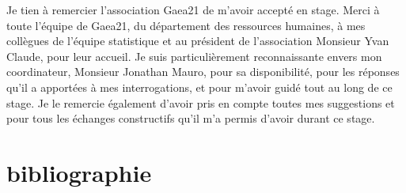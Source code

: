 \documentclass[12pt]{article}
\begin{document}
Je tien à remercier l'association Gaea21 de m'avoir 
accepté en stage. Merci à toute l'équipe de Gaea21, 
du département des ressources humaines, à mes collègues de l'équipe statistique 
et au président de l'association Monsieur Yvan Claude, pour leur accueil. 
Je suis particulièrement reconnaissante envers mon coordinateur, 
Monsieur Jonathan Mauro, pour sa disponibilité, 
pour les réponses qu'il a apportées à mes interrogations,
et pour m'avoir guidé tout au long de ce stage.
Je le remercie également d'avoir pris en compte toutes mes 
suggestions et pour tous les échanges constructifs qu'il m'a permis d'avoir
durant ce stage.


\newpage

\section{bibliographie}
\nocite{*}


\end{document}
